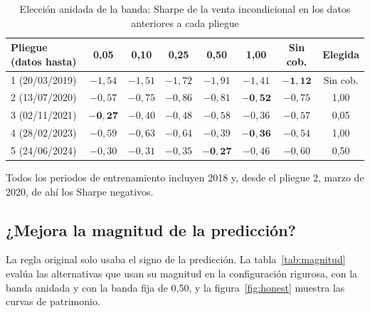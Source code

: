 \documentclass[11pt,a4paper]{article}
\begin{document}
\begin{table}[!htbp]
\centering
\caption{Elección anidada de la banda: Sharpe de la venta incondicional en los datos anteriores a cada pliegue}\label{tab:band}
\small
\begin{tabular}{@{}lcccccc|c@{}}
\toprule
Pliegue (datos hasta) & 0,05 & 0,10 & 0,25 & 0,50 & 1,00 & Sin cob. & Elegida \\
\midrule
1 (20/03/2019) & $-1{,}54$ & $-1{,}51$ & $-1{,}72$ & $-1{,}91$ & $-1{,}41$ & $\mathbf{-1{,}12}$ & Sin cob. \\
2 (13/07/2020) & $-0{,}57$ & $-0{,}75$ & $-0{,}86$ & $-0{,}81$ & $\mathbf{-0{,}52}$ & $-0{,}75$ & 1,00 \\
3 (02/11/2021) & $\mathbf{-0{,}27}$ & $-0{,}40$ & $-0{,}48$ & $-0{,}58$ & $-0{,}36$ & $-0{,}57$ & 0,05 \\
4 (28/02/2023) & $-0{,}59$ & $-0{,}63$ & $-0{,}64$ & $-0{,}39$ & $\mathbf{-0{,}36}$ & $-0{,}54$ & 1,00 \\
5 (24/06/2024) & $-0{,}30$ & $-0{,}31$ & $-0{,}35$ & $\mathbf{-0{,}27}$ & $-0{,}46$ & $-0{,}60$ & 0,50 \\
\bottomrule
\end{tabular}
\par\smallskip\raggedright\footnotesize Todos los periodos de entrenamiento incluyen 2018 y, desde el pliegue 2, marzo de 2020, de ahí los Sharpe negativos.
\end{table}

\subsection{¿Mejora la magnitud de la predicción?}\label{sec:magnitud}

La regla original solo usaba el signo de la predicción. La tabla~\ref{tab:magnitud} evalúa las alternativas que usan su magnitud en la configuración rigurosa, con la banda anidada y con la banda fija de 0,50, y la figura~\ref{fig:honest} muestra las curvas de patrimonio.
\end{document}

